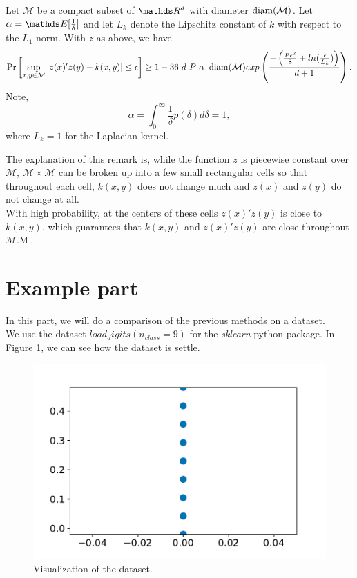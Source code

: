 \documentclass{article}
\begin{document}
\newpage
\begin{remark}
Let $\mathcal{M}$ be a compact subset of $\bbR^d$ with diameter $\operatorname{diam}(\mathcal{M})$. Let $\alpha = \bbE[\frac{1}{\delta}]$ and let $L_k$ denote the Lipschitz constant of $k$ with respect to the $L_1$ norm. With $z$ as above, we have 
\begin{equation*}
    \Pr \left[ \sup_{x,y \in \mathcal{M}} |z(x)'z(y) - k(x,y)| \leq \epsilon \right] \geq 1 - 36\ d \ P \ \alpha \ \diam(\mathcal{M}) exp\left( \frac{-\left( \frac{P\epsilon^2}{8} + ln(\frac{\epsilon}{L_k}) \right)}{d+1} \right).
\end{equation*}
Note, 
\begin{equation*}
    \alpha = \int_0^{\infty} \frac{1}{\delta} p(\delta) d\delta = 1,
\end{equation*}
where $L_k = 1$ for the Laplacian kernel. 
\end{remark}

The explanation of this remark is, while the function $z$ is piecewise constant over $\mathcal{M}$, $\mathcal{M} \times \mathcal{M}$ can be broken up into a few small rectangular cells so that throughout each cell, $k(x,y)$ does not change much and $z(x)$ and $z(y)$ do not change at all. \\
 With high probability, at the centers of these cells $z(x)'z(y)$ is close to $k(x,y)$, which guarantees that $k(x,y)$ and $z(x)'z(y)$ are close throughout $\mathcal{M}$.M


\section{Example part}
In this part, we will do a comparison of the previous methods on a dataset.\\
We use the dataset $load_digits(n_{class}=9)$ for the \textit{sklearn} python package. In Figure \ref{data_plot}, we can see how the dataset is settle. 

\begin{figure}[h!]
    \centering
    \includegraphics[scale=0.7]{images/plot_data.pdf}
    \caption{Visualization of the dataset.}
    \label{data_plot}
\end{figure}
\end{document}
